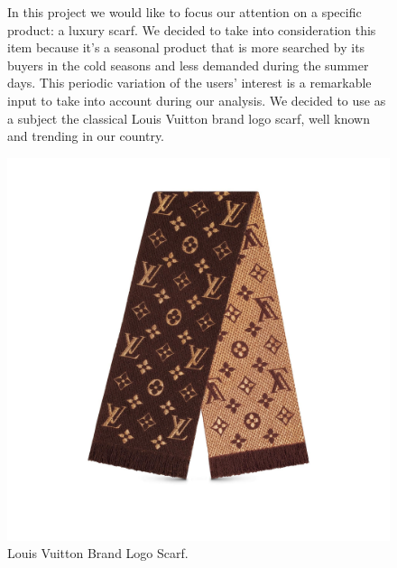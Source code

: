 \begin{figure}[!htp] 
	\begin{flushleft}
		In this project we would like to focus our attention on a specific product: a luxury scarf. We decided to take into consideration this item because it's a seasonal product that is more searched by its buyers in the cold seasons and less demanded during the summer days. This periodic variation of the users' interest is a remarkable input to take into account during our analysis. We decided to use as a subject the classical Louis Vuitton brand logo scarf, well known and trending in our country.
	\end{flushleft}
	\centering
	\includegraphics[width=0.8\linewidth]{sections/images/productLogo}
	\caption{Louis Vuitton Brand Logo Scarf.}
\end{figure}
\clearpage